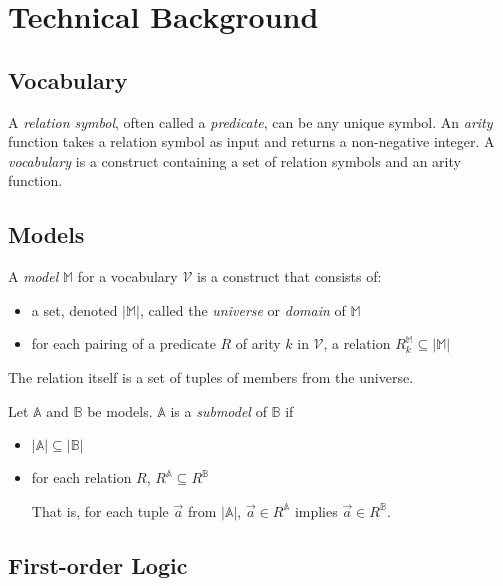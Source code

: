 \section{Technical Background}
\label{sec:technical_background}

	\subsection{Vocabulary}

		A \emph{relation symbol}, often called a \emph{predicate}, can be any
		unique symbol. An \emph{arity} function takes a relation symbol as
		input and returns a non-negative integer. A \emph{vocabulary} is a
		construct containing a set of relation symbols and an arity function.

	\subsection{Models}

		A \emph{model} $\mathbb{M}$ for a vocabulary $\mathcal{V}$ is a
		construct that consists of:
		\begin{itemize}
		\item a set, denoted $|\mathbb{M}|$, called the \emph{universe} or \emph{domain} of $\mathbb{M}$
		\item for each pairing of a predicate $R$ of arity $k$ in $\mathcal{V}$, a relation $R^\mathbb{M}_k \subseteq |\mathbb{M}|$
		\end{itemize}
		The relation itself is a set of tuples of members from the universe.

		\begin{definition}
			Let $\mathbb{A}$ and $\mathbb{B}$ be models. $\mathbb{A}$ is a
			\emph{submodel} of $\mathbb{B}$ if
			\begin{itemize}
			\item $|\mathbb{A}| \subseteq |\mathbb{B}|$
			\item for each relation $R$, $R^\mathbb{A} \subseteq R^\mathbb{B}$

			That is, for each tuple $\vec a$ from $|\mathbb{A}|$, $\vec a \in
			R^\mathbb{A}$ implies  $\vec a \in R^\mathbb{B}$.
			\end{itemize}
		\end{definition}

	\subsection{First-order Logic}

